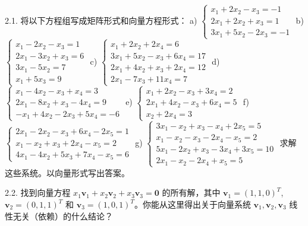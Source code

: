 2.1. 将以下方程组写成矩阵形式和向量方程形式：
a) $\begin{cases} x_1 + 2x_2 - x_3 = -1 \\ 2x_1 + 2x_2 + x_3 = 1 \\ 3x_1 + 5x_2 - 2x_3 = -1 \end{cases}$
b) $\begin{cases} x_1 - 2x_2 - x_3 = 1 \\ 2x_1 - 3x_2 + x_3 = 6 \\ 3x_1 - 5x_2 = 7 \\ x_1 + 5x_3 = 9 \end{cases}$
c) $\begin{cases} x_1 + 2x_2 + 2x_4 = 6 \\ 3x_1 + 5x_2 - x_3 + 6x_4 = 17 \\ 2x_1 + 4x_2 + x_3 + 2x_4 = 12 \\ 2x_1 - 7x_3 + 11x_4 = 7 \end{cases}$
d) $\begin{cases} x_1 - 4x_2 - x_3 + x_4 = 3 \\ 2x_1 - 8x_2 + x_3 - 4x_4 = 9 \\ -x_1 + 4x_2 - 2x_3 + 5x_4 = -6 \end{cases}$
e) $\begin{cases} x_1 + 2x_2 - x_3 + 3x_4 = 2 \\ 2x_1 + 4x_2 - x_3 + 6x_4 = 5 \\ x_2 + 2x_4 = 3 \end{cases}$
f) $\begin{cases} 2x_1 - 2x_2 - x_3 + 6x_4 - 2x_5 = 1 \\ x_1 - x_2 + x_3 + 2x_4 - x_5 = 2 \\ 4x_1 - 4x_2 + 5x_3 + 7x_4 - x_5 = 6 \end{cases}$
g) $\begin{cases} 3x_1 - x_2 + x_3 - x_4 + 2x_5 = 5 \\ x_1 - x_2 - x_3 - 2x_4 - x_5 = 2 \\ 5x_1 - 2x_2 + x_3 - 3x_4 + 3x_5 = 10 \\ 2x_1 - x_2 - 2x_4 + x_5 = 5 \end{cases}$
求解这些系统。以向量形式写出答案。

2.2. 找到向量方程 $x_1 \mathbf{v}_1 + x_2 \mathbf{v}_2 + x_3 \mathbf{v}_3 = \mathbf{0}$ 的所有解，其中 $\mathbf{v}_1 = (1, 1, 0)^T$, $\mathbf{v}_2 = (0, 1, 1)^T$ 和 $\mathbf{v}_3 = (1, 0, 1)^T$。你能从这里得出关于向量系统 $\mathbf{v}_1, \mathbf{v}_2, \mathbf{v}_3$ 线性无关（依赖）的什么结论？


